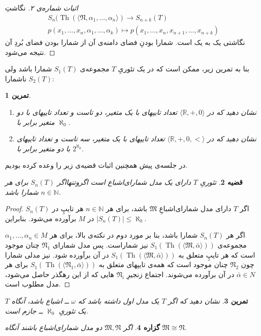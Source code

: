 \documentclass[12pt,a4paper]{report}
\theoremstyle{colorhead}
\newtheorem{thm}{قضیه}
\newtheorem{tam}[thm]{تمرین}
\newtheorem{prop}[thm]{گزاره}
\DeclareMathOperator{\Th}{Th}
\begin{document}
\begin{proof}[اثبات شماره‌ی ۲]
نگاشتِ
\begin{align*}
&
S_n(\Th(\langle \mathfrak{N},\alpha_1,\ldots,\alpha_n\rangle)\to
S_{n+k}(T)\\
& p(x_1,\ldots,x_n,\alpha_1,\ldots,\alpha_k)\mapsto p(x_1,\ldots,x_n,x_{n+1},\ldots,x_{n+k})
\end{align*}
نگاشتی یک به یک است. شمارا بودنِ
فضای دامنه‌ی آن از شمارا بودن فضای بُردِ آن نتیجه می‌شود.
\end{proof}
بنا به تمرین زیر، ممکن است که در یک تئوریِ
$T$
مجموعه‌ی
$S_1(T)$
شمارا باشد ولی
$S_2(T)$
ناشمارا:
\begin{tam}
\hfill
\begin{enumerate}
\item 
نشان دهید که در
$\langle \mathbb{R},+,0\rangle$
تعداد تایپهای با یک متغیر، دو تاست و تعداد تایپهای با دو متغیر برابر با
$\aleph_0$.
\item 
نشان دهید که در
$\langle \mathbb{R},+,0,<\rangle$
تعداد تایپهای با یک متغیر، سه تاست و تعداد تایپهای با دو متغیر برابر با
$2^{\aleph_0}$.
\end{enumerate}
\end{tam}
در جلسه‌ی پیش همچنین اثبات قضیه‌ی زیر را وعده کرده‌ بودیم.
\begin{thm}
تئوریِ
$T$
دارای یک مدل شمارای‌اشباع است اگروتنهااگر 
$S_n(T)$
برای هر
$n\in \mathbb{N}$
شمارا باشد. 
\end{thm}
\begin{proof}
اگر
$T$
دارای مدل شمارای‌اشباعِ
$\mathfrak{M}$ 
باشد، برای هر
$n\in \mathbb{N}$
هر تایپِ در
$S_n(T)$
در
$M$
برآورده می‌شود. بنابراین 
$|S_n(T)|\leq \aleph_0$.
\par 
اگر هر
$S_n(T)$
شمارا باشد، بنا بر مورد دوم
در نکته‌ی بالا، برای هر
$\alpha_1,\ldots,\alpha_n\in M$
مجموعه‌ی
$S_1(\Th(\langle \mathfrak{M},\bar{\alpha}\rangle))$
نیز شماراست. پس مدل شمارای 
$\mathfrak{N}_1$
چنان موجود است که هر تایپِ متعلق به
$S_1(\Th(\langle \mathfrak{M},\bar{\alpha}\rangle))$
در آن برآورده شود. نیز مدلی شمارا چون
$\mathfrak{N}_2$
چنان موجود است که همه‌ی تایپهای متعلق به 
$S_1(\Th(\langle \mathfrak{N}_1,\bar{\alpha}\rangle))$
برای هر
$\bar{\alpha}\in N$
در آن برآورده می‌شوند. اجتماع زنجیرِ
$\mathfrak{N}_i$
هایی که از این رهگذر حاصل می‌شود،‌ مدل مطلوب است.
\end{proof}
\begin{tam}
نشان دهید که اگر
$T$
یک مدل اول داشته باشد که
$\omega$
ــ
اشباع باشد، آنگاه $T$
یک تئوریِ
$\aleph_0$
ــ
جازم است. 
\end{tam}
\begin{prop}
اگر
$\mathfrak{M},\mathfrak{N}$
دو مدل شمارای‌اشباع باشند آنگاه
$\mathfrak{M}\cong \mathfrak{N}$.
\end{prop}
\end{document}
